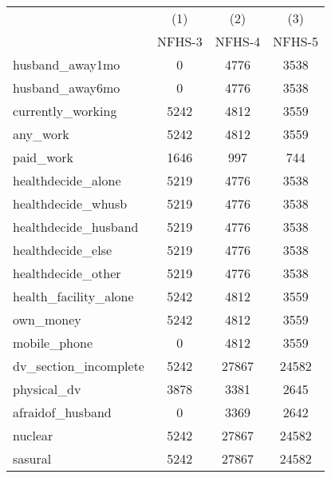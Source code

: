 {
\def\sym#1{\ifmmode^{#1}\else\(^{#1}\)\fi}
\begin{tabular}{l*{3}{c}}
\toprule
            &\multicolumn{1}{c}{(1)}&\multicolumn{1}{c}{(2)}&\multicolumn{1}{c}{(3)}\\
            &\multicolumn{1}{c}{NFHS-3}&\multicolumn{1}{c}{NFHS-4}&\multicolumn{1}{c}{NFHS-5}\\
\midrule
\midrule
husband\_away1mo&           0         &        4776         &        3538         \\
husband\_away6mo&           0         &        4776         &        3538         \\
currently\_working&        5242         &        4812         &        3559         \\
any\_work    &        5242         &        4812         &        3559         \\
paid\_work   &        1646         &         997         &         744         \\
healthdecide\_alone&        5219         &        4776         &        3538         \\
healthdecide\_whusb&        5219         &        4776         &        3538         \\
healthdecide\_husband&        5219         &        4776         &        3538         \\
healthdecide\_else&        5219         &        4776         &        3538         \\
healthdecide\_other&        5219         &        4776         &        3538         \\
health\_facility\_alone&        5242         &        4812         &        3559         \\
own\_money   &        5242         &        4812         &        3559         \\
mobile\_phone&           0         &        4812         &        3559         \\
dv\_section\_incomplete&        5242         &       27867         &       24582         \\
physical\_dv &        3878         &        3381         &        2645         \\
afraidof\_husband&           0         &        3369         &        2642         \\
nuclear     &        5242         &       27867         &       24582         \\
sasural     &        5242         &       27867         &       24582         \\

\end{tabular}}
